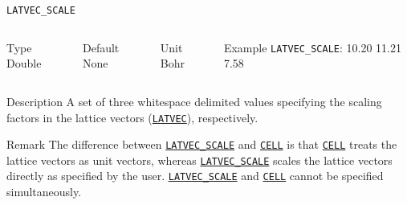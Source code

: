\documentclass[xcolor=dvipsnames,t]{beamer}
\begin{document}
\begin{frame}[allowframebreaks]{\texttt{LATVEC\_SCALE}} \label{LATVEC_SCALE}
\vspace*{-15pt}
\begin{columns}
\begin{block}{Type}
Double
\end{block}

\begin{block}{Default}
None
\end{block}

\begin{block}{Unit}
Bohr
\end{block}

\begin{block}{Example}
\texttt{LATVEC\_SCALE}: 10.20 11.21 7.58
\end{block}
\end{columns}

\vspace*{-2pt}
\begin{block}{Description}
A set of three whitespace delimited values specifying the scaling factors in the lattice vectors (\hyperlink{LATVEC}{\texttt{LATVEC}}), respectively.
\end{block}
\vspace*{-4pt}
\begin{block}{Remark}
    The difference between \hyperlink{LATVEC_SCALE}{\texttt{LATVEC\_SCALE}} and \hyperlink{CELL}{\texttt{CELL}} is that \hyperlink{CELL}{\texttt{CELL}} treats the lattice vectors as unit vectors, whereas \hyperlink{LATVEC_SCALE}{\texttt{LATVEC\_SCALE}} scales the lattice vectors directly as specified by the user. \hyperlink{LATVEC_SCALE}{\texttt{LATVEC\_SCALE}} and \hyperlink{CELL}{\texttt{CELL}} cannot be specified simultaneously.
\end{block}

\end{frame}
\end{document}
